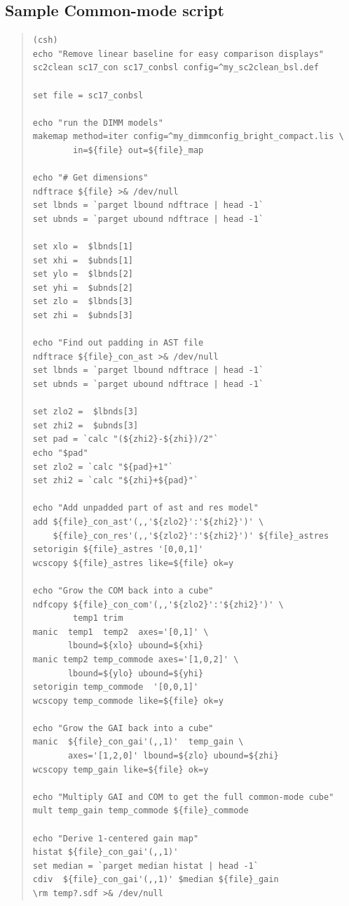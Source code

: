 \documentclass[twoside,11pt]{article}
\newcommand{\xlabel}[1]{}
\renewcommand{\_}{\texttt{\symbol{95}}}
\newenvironment{myquote}{\begin{quote}\begin{small}}{\end{small}\end{quote}}
\begin{document}
\newpage
\subsection{\xlabel{script}Sample Common-mode script}
\label{sec:script}

\begin{myquote}
\begin{verbatim}
(csh)
echo "Remove linear baseline for easy comparison displays"
sc2clean sc17_con sc17_conbsl config=^my_sc2clean_bsl.def

set file = sc17_conbsl

echo "run the DIMM models"
makemap method=iter config=^my_dimmconfig_bright_compact.lis \
        in=${file} out=${file}_map

echo "# Get dimensions"
ndftrace ${file} >& /dev/null
set lbnds = `parget lbound ndftrace | head -1`
set ubnds = `parget ubound ndftrace | head -1`

set xlo =  $lbnds[1]
set xhi =  $ubnds[1]
set ylo =  $lbnds[2]
set yhi =  $ubnds[2]
set zlo =  $lbnds[3]
set zhi =  $ubnds[3]

echo "Find out padding in AST file
ndftrace ${file}_con_ast >& /dev/null
set lbnds = `parget lbound ndftrace | head -1`
set ubnds = `parget ubound ndftrace | head -1`

set zlo2 =  $lbnds[3]
set zhi2 =  $ubnds[3]
set pad = `calc "(${zhi2}-${zhi})/2"`
echo "$pad"
set zlo2 = `calc "${pad}+1"`
set zhi2 = `calc "${zhi}+${pad}"`

echo "Add unpadded part of ast and res model"
add ${file}_con_ast'(,,'${zlo2}':'${zhi2}')' \
    ${file}_con_res'(,,'${zlo2}':'${zhi2}')' ${file}_astres
setorigin ${file}_astres '[0,0,1]'
wcscopy ${file}_astres like=${file} ok=y

echo "Grow the COM back into a cube"
ndfcopy ${file}_con_com'(,,'${zlo2}':'${zhi2}')' \
        temp1 trim
manic  temp1  temp2  axes='[0,1]' \
       lbound=${xlo} ubound=${xhi}
manic temp2 temp_commode axes='[1,0,2]' \
       lbound=${ylo} ubound=${yhi}
setorigin temp_commode  '[0,0,1]'
wcscopy temp_commode like=${file} ok=y

echo "Grow the GAI back into a cube"
manic  ${file}_con_gai'(,,1)'  temp_gain \
       axes='[1,2,0]' lbound=${zlo} ubound=${zhi}
wcscopy temp_gain like=${file} ok=y

echo "Multiply GAI and COM to get the full common-mode cube"
mult temp_gain temp_commode ${file}_commode

echo "Derive 1-centered gain map"
histat ${file}_con_gai'(,,1)'
set median = `parget median histat | head -1`
cdiv  ${file}_con_gai'(,,1)' $median ${file}_gain 
\rm temp?.sdf >& /dev/null
\end{verbatim}
\end{myquote}
\end{document}
